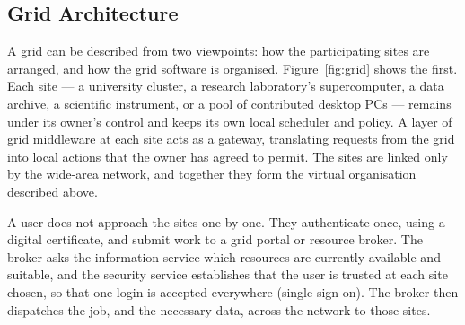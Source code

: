 \subsection{Grid Architecture}

A grid can be described from two viewpoints: how the participating sites are
arranged, and how the grid software is organised. Figure~\ref{fig:grid} shows
the first. Each site --- a university cluster, a research laboratory's
supercomputer, a data archive, a scientific instrument, or a pool of
contributed desktop PCs --- remains under its owner's control and keeps its
own local scheduler and policy. A layer of grid middleware at each site acts
as a gateway, translating requests from the grid into local actions that the
owner has agreed to permit. The sites are linked only by the wide-area
network, and together they form the virtual organisation described above.

A user does not approach the sites one by one. They authenticate once, using
a digital certificate, and submit work to a grid portal or resource broker.
The broker asks the information service which resources are currently
available and suitable, and the security service establishes that the user
is trusted at each site chosen, so that one login is accepted everywhere
(single sign-on). The broker then dispatches the job, and the necessary data,
across the network to those sites.

